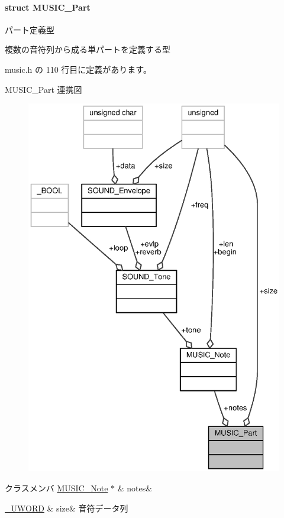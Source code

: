 \paragraph{struct M\+U\+S\+I\+C\+\_\+\+Part}
パート定義型 

複数の音符列から成る単パートを定義する型 

 music.\+h の 110 行目に定義があります。



M\+U\+S\+I\+C\+\_\+\+Part 連携図
\nopagebreak
\begin{figure}[H]
\begin{center}
\leavevmode
\includegraphics[width=350pt]{d2/db5/structMUSIC__Part__coll__graph}
\end{center}
\end{figure}
\begin{DoxyFields}{クラスメンバ}
\hyperlink{music_8h_df/dbe/structMUSIC__Note}{M\+U\+S\+I\+C\+\_\+\+Note} $\ast$\label{music_8h_a91806b7116535402ee7e7cfc28f9e8c9}
&
notes&
\\
\hline

\hyperlink{stddef_8h_af4b45f5ec97da370bd2173b4fe891d76_af4b45f5ec97da370bd2173b4fe891d76}{\+\_\+\+U\+W\+O\+R\+D}\label{music_8h_a674fdda1614f13dcc71a9b3bacea25bf}
&
size&
音符データ列 \\
\hline

\end{DoxyFields}
\label{structMUSIC__Score}
